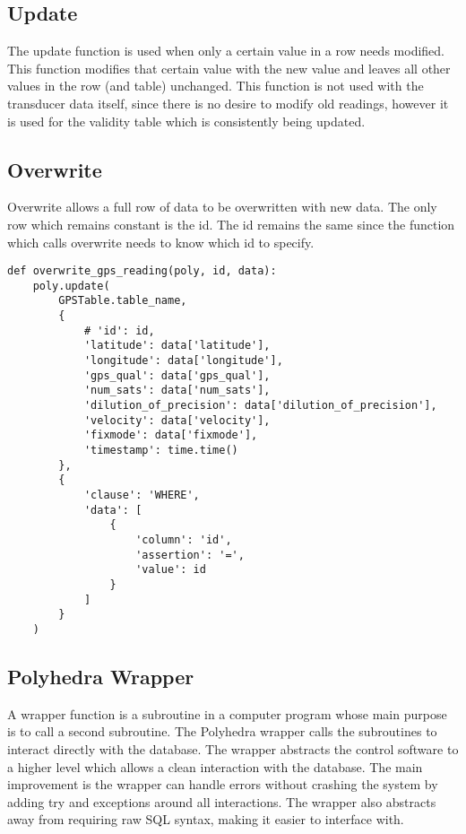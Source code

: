 \subsection{Update}
The update function is used when only a certain value in a row needs modified. This function modifies that certain value with the new value and leaves all other values in the row (and table) unchanged. This function is not used with the transducer data itself, since there is no desire to modify old readings, however it is used for the validity table which is consistently being updated. 


\subsection{Overwrite}
Overwrite allows a full row of data to be overwritten with new data. The only row which remains constant is the id. The id remains the same since the function which calls overwrite needs to know which id to specify. 

\begin{lstlisting}[style=custompython]
def overwrite_gps_reading(poly, id, data):
    poly.update(
        GPSTable.table_name,
        {
            # 'id': id,
            'latitude': data['latitude'],
            'longitude': data['longitude'],
            'gps_qual': data['gps_qual'],
            'num_sats': data['num_sats'],
            'dilution_of_precision': data['dilution_of_precision'],
            'velocity': data['velocity'],
            'fixmode': data['fixmode'],
            'timestamp': time.time()
        },
        {
            'clause': 'WHERE',
            'data': [
                {
                    'column': 'id',
                    'assertion': '=',
                    'value': id
                }
            ]
        }
    )
\end{lstlisting}
\noindent
\subsection{Polyhedra Wrapper}
A wrapper function is a subroutine in a computer program whose main purpose is to call a second subroutine. The Polyhedra wrapper calls the subroutines to interact directly with the database. The wrapper abstracts the control software to a higher level which allows a clean interaction with the database. The main improvement is the wrapper can handle errors without crashing the system by adding try and exceptions around all interactions. The wrapper also abstracts away from requiring raw SQL syntax, making it easier to interface with.


